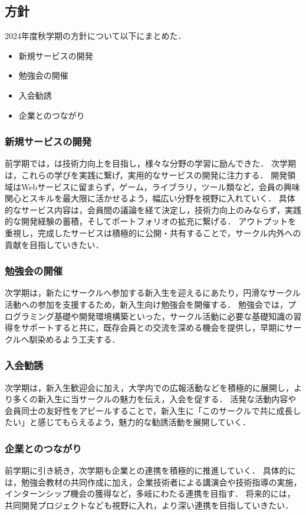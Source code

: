 \subsection*{\firstGrade{}方針}


2024年度秋学期の\firstGrade{}方針について以下にまとめた．

\begin{itemize}
	\item 新規サービスの開発
	\item 勉強会の開催
	\item 入会勧誘
	\item 企業とのつながり
\end{itemize}

\subsubsection*{新規サービスの開発}

前学期では，\firstGrade{}は技術力向上を目指し，様々な分野の学習に励んできた．
次学期は，これらの学びを実践に繋げ，実用的なサービスの開発に注力する．
開発領域はWebサービスに留まらず，ゲーム，ライブラリ，ツール類など，会員の興味関心とスキルを最大限に活かせるよう，幅広い分野を視野に入れていく．
具体的なサービス内容は，会員間の議論を経て決定し，技術力向上のみならず，実践的な開発経験の蓄積，そしてポートフォリオの拡充に繋げる．
アウトプットを重視し，完成したサービスは積極的に公開・共有することで，サークル内外への貢献を目指していきたい．

\subsubsection*{勉強会の開催}

次学期は，新たにサークルへ参加する新入生を迎えるにあたり，円滑なサークル活動への参加を支援するため，新入生向け勉強会を開催する．
勉強会では，プログラミング基礎や開発環境構築といった，サークル活動に必要な基礎知識の習得をサポートすると共に，既存会員との交流を深める機会を提供し，早期にサークルへ馴染めるよう工夫する．

\subsubsection*{入会勧誘}

次学期は，新入生歓迎会に加え，大学内での広報活動などを積極的に展開し，より多くの新入生に当サークルの魅力を伝え，入会を促する．
活発な活動内容や会員同士の友好性をアピールすることで，新入生に「このサークルで共に成長したい」と感じてもらえるよう，魅力的な勧誘活動を展開していく．

\subsubsection*{企業とのつながり}

前学期に引き続き，次学期も企業との連携を積極的に推進していく．
具体的には，勉強会教材の共同作成に加え，企業技術者による講演会や技術指導の実施，インターンシップ機会の獲得など，多岐にわたる連携を目指す．
将来的には，共同開発プロジェクトなども視野に入れ，より深い連携を目指していきたい．
